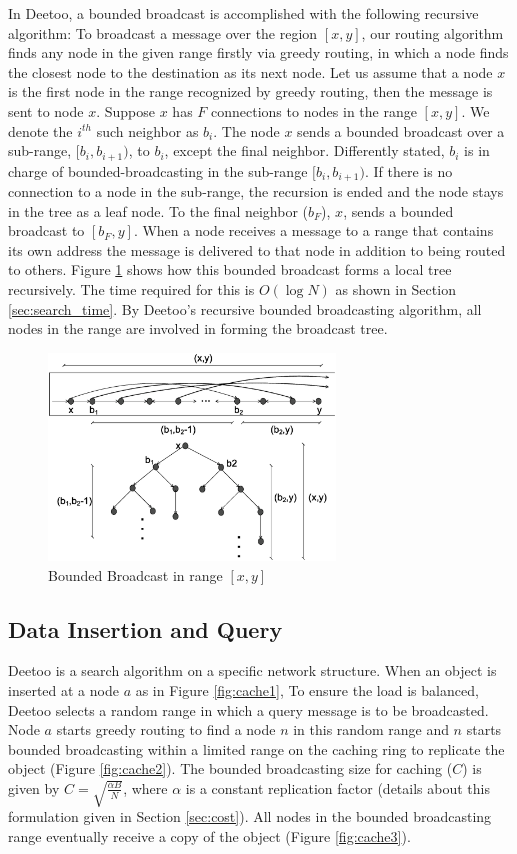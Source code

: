 \documentclass[9.5pt,journal,final,finalsubmission,twocolumn]{IEEEtran}
\begin{document}
In Deetoo, a bounded broadcast is accomplished with the following 
recursive algorithm:  
To broadcast a message over the region $[x, y]$, 
our routing algorithm finds any node in the given range firstly via greedy routing,
in which a node finds the closest node to the destination as its next node.
Let us assume that a node $x$ is the first node in the range recognized by greedy routing, 
then the message is sent to node $x$. 
Suppose $x$ has $F$ connections to nodes in the range $[x, y]$. 
We denote the $i^{th}$ such neighbor as $b_i$.
The node $x$ sends a bounded broadcast over a sub-range, 
$[b_i, b_{i+1})$, to $b_i$, except the final neighbor. 
Differently stated, $b_i$ is in charge of bounded-broadcasting 
in the sub-range $[b_i, b_{i+1})$. If there is no connection to a node in the sub-range, 
the recursion is ended and the node stays in the tree as a leaf node.
To the final
neighbor ($b_F$), $x$, sends a bounded broadcast to $[b_F, y]$.
When a node receives a message to a range that contains its own address
the message is delivered to that node in addition to being routed to others.
Figure \ref{fig:tree} shows how this bounded broadcast forms a local 
tree recursively. The time required for this is $O(\log N)$ as 
shown in Section \ref{sec:search_time}.
By Deetoo's recursive bounded broadcasting algorithm, all nodes in the range 
are involved in forming the broadcast tree.

\begin{figure}
\centering
\includegraphics[width=3.0in]{tree}
\caption{Bounded Broadcast in range $[x, y]$} \label{fig:tree}
\end{figure}

\subsection{Data Insertion and Query}\label{sec:cache}
Deetoo is a search algorithm on a specific network structure. When an object
is inserted at a node $a$ as in Figure \ref{fig:cache1}, 
To ensure the load is balanced, Deetoo selects a random
range in which a query message is to be broadcasted.
Node $a$ starts greedy routing to find a node 
$n$ in this random range and $n$ starts bounded broadcasting 
within a limited range on the caching ring to replicate the object
(Figure \ref{fig:cache2}). 
The bounded broadcasting size for caching ($C$) is given by
$C=\sqrt{\frac{\alpha B}{N}}$, where $\alpha$ is a constant replication factor
(details about this formulation given in Section
\ref{sec:cost}). All nodes in the bounded broadcasting range
eventually receive a copy of the object (Figure \ref{fig:cache3}).
\end{document}
